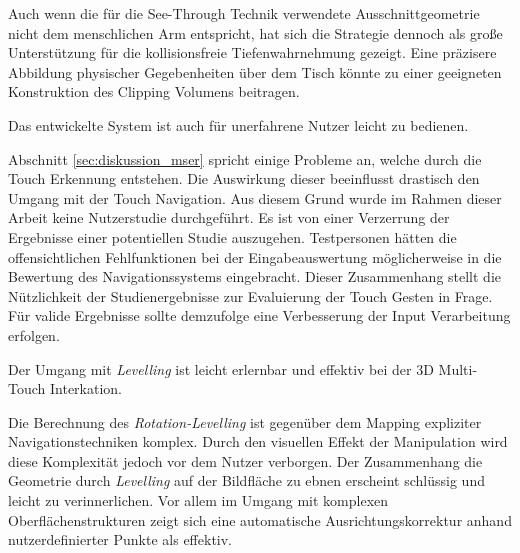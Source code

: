 Auch wenn die für die See-Through Technik verwendete Ausschnittgeometrie nicht dem menschlichen Arm entspricht, hat sich die Strategie dennoch als große Unterstützung für die kollisionsfreie Tiefenwahrnehmung gezeigt. Eine präzisere Abbildung physischer Gegebenheiten über dem Tisch könnte zu einer geeigneten Konstruktion des Clipping Volumens beitragen.

	\begin{hypothese}
		\label{hyp:unerfahrene}
		Das entwickelte System ist auch für unerfahrene Nutzer leicht zu bedienen.
	\end{hypothese}
	
Abschnitt \ref{sec:diskussion_mser} spricht einige Probleme an, welche durch die Touch Erkennung entstehen. Die Auswirkung dieser beeinflusst drastisch den Umgang mit der Touch Navigation. Aus diesem Grund wurde im Rahmen dieser Arbeit keine Nutzerstudie durchgeführt. Es ist von einer Verzerrung  der Ergebnisse einer potentiellen Studie auszugehen. Testpersonen hätten die offensichtlichen Fehlfunktionen bei der Eingabeauswertung möglicherweise in die Bewertung des Navigationssystems eingebracht. Dieser Zusammenhang stellt die Nützlichkeit der Studienergebnisse zur Evaluierung der Touch Gesten in Frage. Für valide Ergebnisse sollte demzufolge eine Verbesserung der Input Verarbeitung erfolgen.

	\begin{hypothese}
		\label{hyp:levelling}
		Der Umgang mit \emph{Levelling} ist leicht erlernbar und effektiv bei der 3D Multi-Touch Interkation.
	\end{hypothese}
	
Die Berechnung des \emph{Rotation-Levelling} ist gegenüber dem Mapping expliziter Navigationstechniken komplex. Durch den visuellen Effekt der Manipulation wird diese Komplexität jedoch vor dem Nutzer verborgen. Der Zusammenhang die Geometrie durch \emph{Levelling} auf der Bildfläche zu ebnen erscheint schlüssig und leicht zu verinnerlichen. Vor allem im Umgang mit komplexen Oberflächenstrukturen zeigt sich eine automatische Ausrichtungskorrektur anhand nutzerdefinierter Punkte als effektiv.